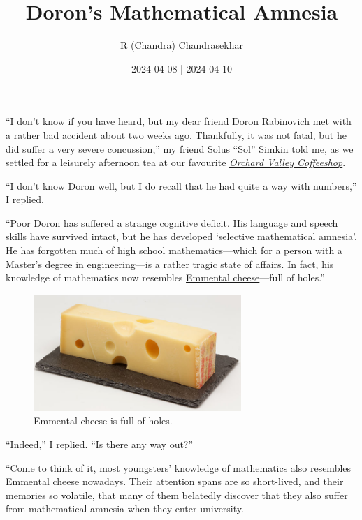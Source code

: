 \documentclass[
  a4paper,
]{article}
\title{Doron's Mathematical Amnesia}
\author{R (Chandra) Chandrasekhar}
\date{2024-04-08 | 2024-04-10}
\begin{document}
\maketitle

\thispagestyle{empty}


``I don't know if you have heard, but my dear friend Doron Rabinovich
met with a rather bad accident about two weeks ago. Thankfully, it was
not fatal, but he did suffer a very severe concussion,'' my friend Solus
``Sol'' Simkin told me, as we settled for a leisurely afternoon tea at
our favourite \href{http://www.orchardvalleycoffee.net/}{\emph{Orchard
Valley Coffeeshop}}.

``I don't know Doron well, but I do recall that he had quite a way with
numbers,'' I replied.

``Poor Doron has suffered a strange cognitive deficit. His language and
speech skills have survived intact, but he has developed `selective
mathematical amnesia'. He has forgotten much of high school
mathematics---which for a person with a Master's degree in
engineering---is a rather tragic state of affairs. In fact, his
knowledge of mathematics now resembles
\href{https://en.wikipedia.org/wiki/Emmental_cheese}{Emmental
cheese}---full of holes.''

\begin{figure}
\centering
\includegraphics[width=0.7\textwidth,height=\textheight]{images/emmental-cheese.jpg}
\caption[Emmental cheese is full of holes.]{Emmental cheese is full of
holes.\footnotemark{}}\label{fig:cheese}
\end{figure}

``Indeed,'' I replied. ``Is there any way out?''

``Come to think of it, most youngsters' knowledge of mathematics also
resembles Emmental cheese nowadays. Their attention spans are so
short-lived, and their memories so volatile, that many of them belatedly
discover that they also suffer from mathematical amnesia when they enter
university.
\end{document}
